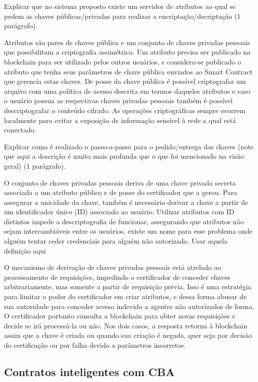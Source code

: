 \documentclass[a4paper,11pt]{article}
\begin{document}
{\color{ForestGreen}Explicar que no sistema proposto existe um servidor de atributos ao qual se pedem as chaves públicas/privadas para realizar a encriptação/decriptação (1 parágrafo).} 

Atributos são pares de chaves pública e um conjunto de chaves privadas pessoais que possibilitam a criptografia assimétrica. Um atributo precisa ser publicado na blockchain para ser utilizado pelos outros usuários, e considera-se publicado o atributo que tenha seus parâmetros de chave pública enviados ao Smart Contract que gerencia estas chaves. De posse da chave pública é possível criptografar um arquivo com uma política de acesso descrita em termos daqueles atributos e caso o usuário possua as respectivas chaves privadas pessoais também é possível descriptografar o conteúdo cifrado. As operações criptográficas sempre ocorrem localmente para evitar a exposição de informação sensível à rede a qual está conectado.

{\color{ForestGreen}Explicar como é realizado o passo-a-passo para o pedido/entrega das chaves (note que aqui a descrição é muito mais profunda que o que foi mencionado na visão geral) (1 parágrafo).} 

O conjunto de chaves privadas pessoais deriva de uma chave privada secreta associada a um atributo público e de posse do certificador que a gerou. Para assegurar a unicidade da chave, também é necessário derivar a chave a partir de um identificador único (ID) associado ao usuário. Utilizar atributos com ID distintos impede a descriptografia de funcionar, assegurando que atributos não sejam intercambiáveis entre os usuários. {\color{RoyalBlue} existe um nome para esse problema onde alguém tentar ceder credenciais para alguém não autorizado. Usar aquela definição aqui} 

O mecanismo de derivação de chaves privadas pessoais está atrelado ao processamento de requisições, impedindo o certificador de conceder chaves arbitrariamente, mas somente a partir de requisição prévia. Isso é uma estratégia para limitar o poder do certificador em criar atributos, e dessa forma abusar de sua autoridade para conceder acesso indevido a agentes não autorizados de forma. O certificador portanto consulta a blockchain para obter novas requisições e decide se irá processá-la ou não. Nos dois casos, a resposta retorna à blockchain assim que a chave é criada ou quando sua criação é negada, quer seja por decisão do certificação ou por falha devido a parâmetros incorretos. 


\subsection{Contratos inteligentes com CBA}
\end{document}
